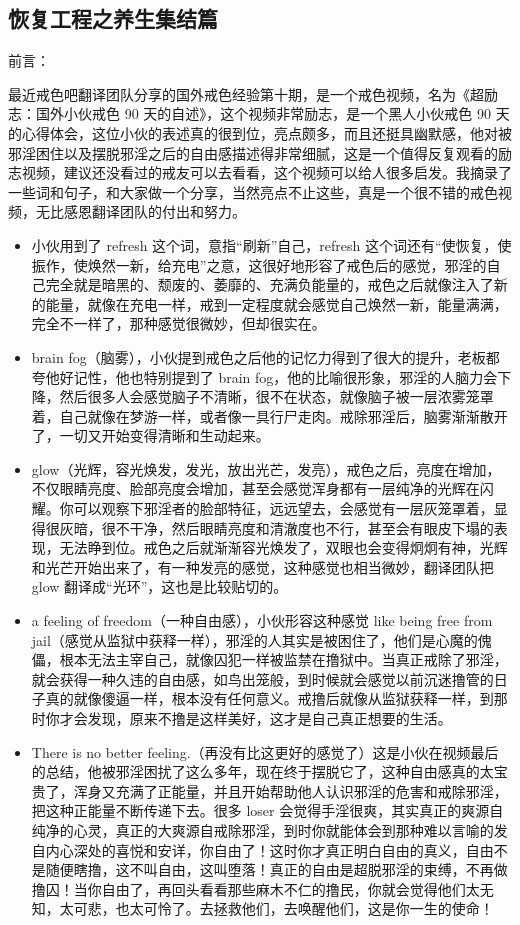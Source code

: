 \subsection{恢复工程之养生集结篇}

前言：

最近戒色吧翻译团队分享的国外戒色经验第十期，是一个戒色视频，名为《超励志：国外小伙戒色 90 天的自述》，这个视频非常励志，是一个黑人小伙戒色 90 天的心得体会，这位小伙的表述真的很到位，亮点颇多，而且还挺具幽默感，他对被邪淫困住以及摆脱邪淫之后的自由感描述得非常细腻，这是一个值得反复观看的励志视频，建议还没看过的戒友可以去看看，这个视频可以给人很多启发。我摘录了一些词和句子，和大家做一个分享，当然亮点不止这些，真是一个很不错的戒色视频，无比感恩翻译团队的付出和努力。

\begin{itemize}
    \item 小伙用到了 refresh 这个词，意指“刷新”自己，refresh 这个词还有“使恢复，使振作，使焕然一新，给充电”之意，这很好地形容了戒色后的感觉，邪淫的自己完全就是暗黑的、颓废的、萎靡的、充满负能量的，戒色之后就像注入了新的能量，就像在充电一样，戒到一定程度就会感觉自己焕然一新，能量满满，完全不一样了，那种感觉很微妙，但却很实在。
    \item brain fog（脑雾），小伙提到戒色之后他的记忆力得到了很大的提升，老板都夸他好记性，他也特别提到了 brain fog，他的比喻很形象，邪淫的人脑力会下降，然后很多人会感觉脑子不清晰，很不在状态，就像脑子被一层浓雾笼罩着，自己就像在梦游一样，或者像一具行尸走肉。戒除邪淫后，脑雾渐渐散开了，一切又开始变得清晰和生动起来。
    \item glow（光辉，容光焕发，发光，放出光芒，发亮），戒色之后，亮度在增加，不仅眼睛亮度、脸部亮度会增加，甚至会感觉浑身都有一层纯净的光辉在闪耀。你可以观察下邪淫者的脸部特征，远远望去，会感觉有一层灰笼罩着，显得很灰暗，很不干净，然后眼睛亮度和清澈度也不行，甚至会有眼皮下塌的表现，无法睁到位。戒色之后就渐渐容光焕发了，双眼也会变得炯炯有神，光辉和光芒开始出来了，有一种发亮的感觉，这种感觉也相当微妙，翻译团队把 glow 翻译成“光环”，这也是比较贴切的。
    \item a feeling of freedom（一种自由感），小伙形容这种感觉 like being free from jail（感觉从监狱中获释一样），邪淫的人其实是被困住了，他们是心魔的傀儡，根本无法主宰自己，就像囚犯一样被监禁在撸狱中。当真正戒除了邪淫，就会获得一种久违的自由感，如鸟出笼般，到时候就会感觉以前沉迷撸管的日子真的就像傻逼一样，根本没有任何意义。戒撸后就像从监狱获释一样，到那时你才会发现，原来不撸是这样美好，这才是自己真正想要的生活。
    \item There is no better feeling.（再没有比这更好的感觉了）这是小伙在视频最后的总结，他被邪淫困扰了这么多年，现在终于摆脱它了，这种自由感真的太宝贵了，浑身又充满了正能量，并且开始帮助他人认识邪淫的危害和戒除邪淫，把这种正能量不断传递下去。很多 loser 会觉得手淫很爽，其实真正的爽源自纯净的心灵，真正的大爽源自戒除邪淫，到时你就能体会到那种难以言喻的发自内心深处的喜悦和安详，你自由了！这时你才真正明白自由的真义，自由不是随便瞎撸，这不叫自由，这叫堕落！真正的自由是超脱邪淫的束缚，不再做撸囚！当你自由了，再回头看看那些麻木不仁的撸民，你就会觉得他们太无知，太可悲，也太可怜了。去拯救他们，去唤醒他们，这是你一生的使命！
\end{itemize}

